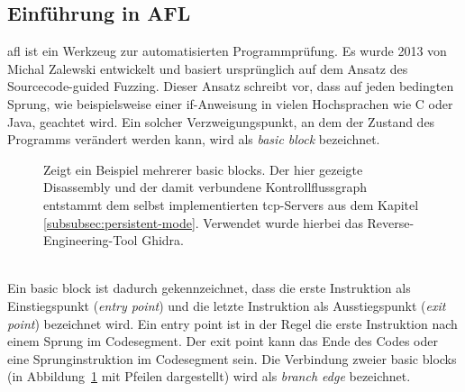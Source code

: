 
\subsection{Einführung in AFL}\label{subsec:afl}
\gls{afl} ist ein Werkzeug zur automatisierten Programmprüfung.
Es wurde 2013 von Michal Zalewski entwickelt und basiert ursprünglich auf dem Ansatz des Sourcecode-guided Fuzzing.
Dieser Ansatz schreibt vor, dass auf jeden bedingten Sprung, wie beispielsweise einer if-Anweisung in vielen Hochsprachen
wie C oder Java, geachtet wird.
Ein solcher Verzweigungspunkt, an dem der Zustand des Programms verändert werden kann, wird als \textit{basic block} bezeichnet.
\begin{figure}[h]
    \caption{Zeigt ein Beispiel mehrerer basic blocks. Der hier gezeigte Disassembly und der damit verbundene
    Kontrollflussgraph entstammt dem selbst implementierten \gls{tcp}-Servers aus dem Kapitel \ref{subsubsec:persistent-mode}.
    Verwendet wurde hierbei das Reverse-Engineering-Tool Ghidra.}\label{fig:basic-block}
\end{figure}\\
Ein basic block ist dadurch gekennzeichnet, dass die erste Instruktion als Einstiegspunkt (\textit{entry point}) und die letzte Instruktion
als Ausstiegspunkt (\textit{exit point}) bezeichnet wird.
Ein entry point ist in der Regel die erste Instruktion nach einem Sprung im Codesegment.
Der exit point kann das Ende des Codes oder eine Sprunginstruktion im Codesegment sein.
Die Verbindung zweier basic blocks (in Abbildung~\ref{fig:basic-block} mit Pfeilen dargestellt) wird als \textit{branch edge} bezeichnet.
